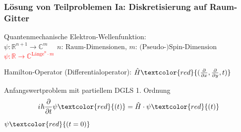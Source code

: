 \documentclass{beamer}
\newcommand{\iu}{{i\mkern1mu}} 	%
\newcommand{\absatz}{\vskip3mm}
\begin{document}
\begin{frame}[t] %
  \frametitle{Lösung von Teilproblemen Ia: Diskretisierung auf Raum-Gitter}
 Quantenmechanische Elektron-Wellenfunktion: \\
 \sout{$\psi: \mathbb{R}^{n+1} \rightarrow \mathbb{C}^m$} $ \quad \text{$n$: Raum-Dimensionen, $m$: (Pseudo-)Spin-Dimension}$
 \\
\textcolor{red}{$\psi: \mathbb{R} \rightarrow \mathbb{C}^{\text{Länge}^n\cdot m} $}

 \absatz
 Hamilton-Operator (Differentialoperator): $\hat{H}\textcolor{red}{(\frac{\partial}{\partial x}, \frac{\partial}{\partial y}, t)}$

 \begin{block}{Anfangswertproblem mit partiellem DGLS 1. Ordnung}
  \begin{equation*}
    \iu \hbar \frac{\partial}{\partial t}  \psi\textcolor{red}{(t)} = \hat{H} \cdot \psi\textcolor{red}{(t)} 
  \end{equation*}

    $\psi\textcolor{red}{(t=0)}$
    \end{block}
\end{frame}




\end{document}
